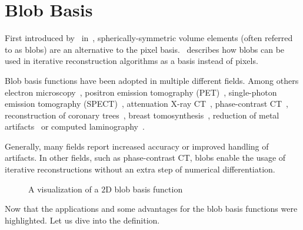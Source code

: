 \section{Blob Basis}\label{sec:blob_basis}

First introduced by~\citeauthor*{lewitt_multidimensional_1990}
in~\cite{lewitt_multidimensional_1990}, spherically-symmetric volume elements (often referred to as
blobs) are an alternative to the pixel basis.~\cite{lewitt_alternatives_1992} describes how blobs
can be used in iterative reconstruction algorithms as a basis instead of pixels.

Blob basis functions have been adopted in multiple different fields. Among others electron
microscopy~\cite{marabini_3d_1998, garduno_optimization_2001}, positron emission tomography
(PET)~\cite{jacobs_comparative_1999, chlewicki_noise_2004}, single-photon emission tomography
(SPECT)~\cite{wang_3d_2004, yendiki_comparison_2004}, attenuation X-ray
CT~\cite{jacobs_iterative_1999, carvalho_helical_2003, isola_motion-compensated_2008},
phase-contrast CT~\cite{kohler_iterative_2011, xu_investigation_2012}, reconstruction of coronary
trees~\cite{zhou_blob-based_2008}, breast tomosynthesis~\cite{wu_breast_2010}, reduction of metal
artifacts~\cite{levakhina_two-step_2010} or computed laminography~\cite{trampert_spherically_2017}.

Generally, many fields report increased accuracy or improved handling of artifacts. In other fields,
such as phase-contrast CT, blobs enable the usage of iterative reconstructions without an extra step
of numerical differentiation.

\begin{figure}
	\caption{A visualization of a \(2\)D blob basis function}\label{fig:blob_basis}
\end{figure}

Now that the applications and some advantages for the blob basis functions were highlighted. Let us
dive into the definition.


